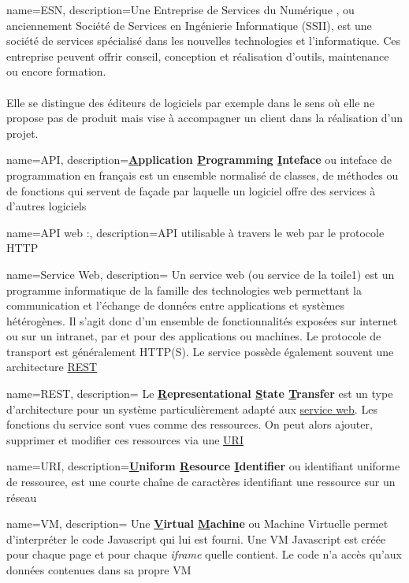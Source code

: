 {
	name=ESN,
    description={Une Entreprise de Services du Numérique , ou anciennement Société de Services en Ingénierie Informatique (SSII), est une société de services spécialisé dans les nouvelles technologies et l’informatique. Ces entreprise peuvent offrir conseil, conception et réalisation d’outils, maintenance ou encore formation.\\\\
    Elle se distingue des éditeurs de logiciels par exemple dans le sens où elle ne propose pas de produit mais vise à accompagner un client dans la réalisation d'un projet.}
}

{
    name=API,
    description={\textbf{\underline{A}pplication \underline{P}rogramming \underline{I}nteface} ou inteface de programmation en français est un ensemble normalisé de classes, de méthodes ou de fonctions qui servent de façade par laquelle un logiciel offre des services à d'autres logiciels}
}

{
    name=API web :,
    description={\gls{API} utilisable à travers le web par le protocole HTTP}
}

{
    name=Service Web,
    description=
    {
        Un service web (ou service de la toile1) est un programme informatique de la famille des technologies web permettant la communication et l'échange de données entre applications et systèmes hétérogènes.
        Il s'agit donc d'un ensemble de fonctionnalités exposées sur internet ou sur un intranet, par et pour des applications ou machines.
        Le protocole de transport est généralement HTTP(S). Le service possède également souvent une architecture \underline{\gls{REST}}
    }
}

{
    name=REST,
    description=
    {
        Le \textbf{\underline{R}epresentational \underline{S}tate \underline{T}ransfer} est un type d'architecture pour un système particulièrement adapté aux \underline{\gls{service web}}. Les fonctions du service sont vues comme des ressources. On peut alors ajouter, supprimer et modifier ces ressources via une \underline{\gls{URI}}
    }
}

{
    name=URI,
    description={\textbf{\underline{U}niform \underline{R}esource \underline{I}dentifier} ou identifiant uniforme de ressource, est une courte chaîne de caractères identifiant une ressource sur un réseau}
}

{
    name=VM,
    description=
    {
        Une \textbf{\underline{V}irtual \underline{M}achine} ou Machine Virtuelle permet d'interpréter le code Javascript qui lui est fourni. Une VM Javascript est créée pour chaque page et pour chaque \textit{iframe} quelle contient. Le code n'a accès qu'aux données contenues dans sa propre VM
    }
}

